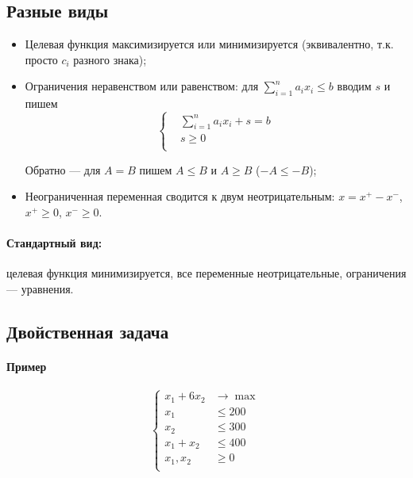 \subsection{Разные виды}
\begin{itemize}
    \item Целевая функция максимизируется или минимизируется
    (эквивалентно, т.к. просто $c_i$ разного знака);

    \item Ограничения неравенством или равенством:
    для $\sum_{i=1}^n a_i x_i \le b$
    вводим $s$ и пишем
    \[
        \left\{
        \begin{aligned}
            & \sum_{i=1}^n a_i x_i + s = b \\
            & s \ge 0 \\
        \end{aligned}
        \right.
    \]

    Обратно --- для $A = B$ пишем $A \le B$ и $A \ge B$ ($-A \le -B$);

    \item Неограниченная переменная сводится к двум неотрицательным:
    $x = x^+ - x^-$, $x^+ \ge 0$, $x^- \ge 0$.
\end{itemize}

\paragraph{Стандартный вид:}
целевая функция минимизируется,
все переменные неотрицательные,
ограничения --- уравнения.



\subsection{Двойственная задача}
\paragraph{Пример}
\[
    \left\{
    \begin{aligned}
        x_1 + 6 x_2 & \to \max \\
        x_1 & \le 200 \\
        x_2 & \le 300 \\
        x_1 + x_2 & \le 400 \\
        x_1, x_2 & \ge 0 \\
    \end{aligned}
    \right.
\]

